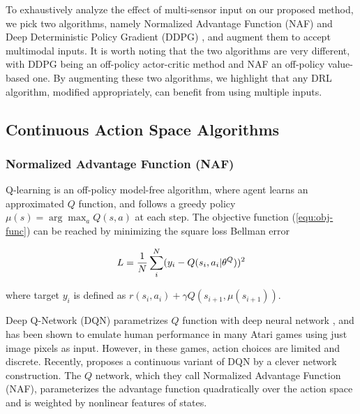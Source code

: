 \documentclass[../thesis.tex]{subfiles}
\begin{document}
To exhaustively analyze the effect of multi-sensor input on our proposed method, we pick two algorithms, namely Normalized Advantage Function (NAF) \cite{CDQN} and Deep Deterministic Policy Gradient (DDPG) \cite{DBLP:journals/corr/LillicrapHPHETS15}, and augment them to accept multimodal inputs. 
It is worth noting that the two algorithms are very different, with DDPG being an off-policy actor-critic method and NAF an off-policy value-based one. 
By augmenting these two algorithms, we highlight that any DRL algorithm, modified appropriately, can benefit from using multiple inputs. 

 
\subsection{Continuous Action Space Algorithms}
 
\subsubsection{Normalized Advantage Function (NAF)}
\label{sec:CDQN}
 
Q-learning \cite{sutton1999policy} is an off-policy model-free algorithm, where agent learns an approximated $Q$ function, and follows a greedy policy $\mu(s)=\arg\max_aQ(s,a)$ at each step. The objective function (\ref{equ:obj-func}) can be reached by minimizing the square loss Bellman error
 
\begin{align}
\centering
L = \frac{1}{N} \sum_i^N (y_i-Q(s_i,a_i|\theta^Q))^2
\end{align}
 
where target $y_i$ is defined as $r(s_i,a_i) + \gamma Q(s_{i+1},\mu(s_{i+1}))$.
 
 
Deep Q-Network (DQN) parametrizes $Q$ function with deep neural network \cite{mnih2013playing}, and has been shown to emulate human performance \cite{mnih2015human} in many Atari games using just image pixels as input. However, in these games, action choices are limited and discrete. Recently, \citet{CDQN} proposes a continuous variant of DQN by a clever network construction. The $Q$ network, which they call Normalized Advantage Function (NAF), parameterizes the advantage function quadratically over the action space and is weighted by nonlinear features of states.
\end{document}
